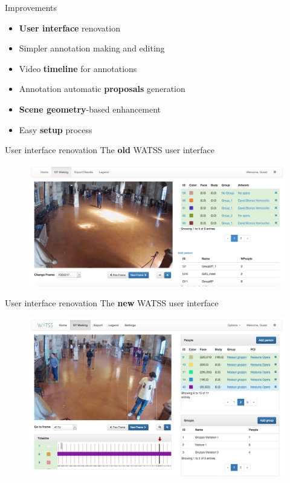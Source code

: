 \documentclass{beamer}
\begin{document}
\begin{tframe}{Improvements}
\begin{itemize}
\vspace{0.3cm}
\item \textbf{User interface} renovation
\vspace{0.2cm}
\item Simpler annotation making and editing
\vspace{0.2cm}
\item Video \textbf{timeline} for annotations
\vspace{0.2cm}
\item Annotation automatic \textbf{proposals} generation
\vspace{0.2cm}
\item \textbf{Scene geometry}-based enhancement
\vspace{0.2cm}
\item Easy \textbf{setup} process
\end{itemize}
\end{tframe}

\begin{tframe}{User interface renovation}
The \textbf{old} WATSS user interface
\begin{figure}[h]
\centering
\includegraphics[scale=0.13]{images/watss_old.jpg}
\end{figure}
\end{tframe}

\begin{tframe}{User interface renovation}
The \textbf{new} WATSS user interface
\begin{figure}[h]
\centering
\includegraphics[scale=0.22]{images/watss-gui.jpg}
\end{figure}
\end{tframe}
\end{document}
